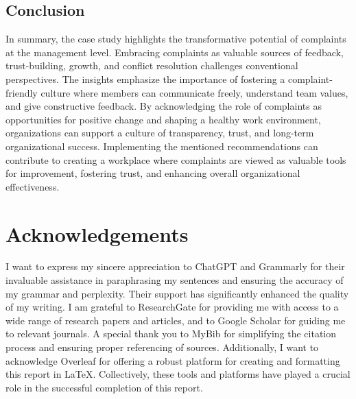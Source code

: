 \documentclass[a4paper,12pt]{article}
\begin{document}
\subsection{Conclusion}
In summary, the case study highlights the transformative potential of complaints at the management level. Embracing complaints as valuable sources of feedback, trust-building, growth, and conflict resolution challenges conventional perspectives. The insights emphasize the importance of fostering a complaint-friendly culture where members can communicate freely, understand team values, and give constructive feedback. By acknowledging the role of complaints as opportunities for positive change and shaping a healthy work environment, organizations can support a culture of transparency, trust, and long-term organizational success\cite{benefits_complain}. Implementing the mentioned recommendations can contribute to creating a workplace where complaints are viewed as valuable tools for improvement, fostering trust, and enhancing overall organizational effectiveness.

\newpage
\section{Acknowledgements}
I want to express my sincere appreciation to ChatGPT and Grammarly for their invaluable assistance in paraphrasing my sentences and ensuring the accuracy of my grammar and perplexity. Their support has significantly enhanced the quality of my writing. I am grateful to ResearchGate for providing me with access to a wide range of research papers and articles, and to Google Scholar for guiding me to relevant journals. A special thank you to MyBib for simplifying the citation process and ensuring proper referencing of sources. Additionally, I want to acknowledge Overleaf for offering a robust platform for creating and formatting this report in LaTeX. Collectively, these tools and platforms have played a crucial role in the successful completion of this report.
\end{document}
